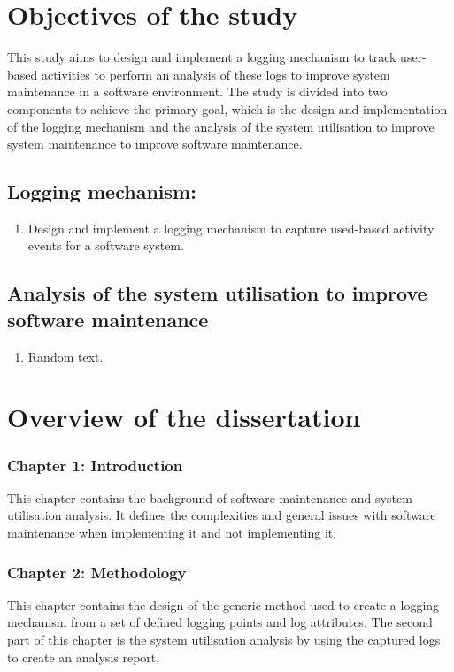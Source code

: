 \section{Objectives of the study}\label{sec:ch1_objectives}
This study aims to design and implement a logging mechanism to track user-based activities to perform an analysis of these logs to improve system maintenance in a software environment. The study is divided into two components to achieve the primary goal, which is the design and implementation of the logging mechanism and the analysis of the system utilisation to improve system maintenance to improve software maintenance.

\subsection{Logging mechanism:}
\begin{enumerate}
	\item Design and implement a logging mechanism to capture used-based activity events for a software system.
\end{enumerate}

\subsection{Analysis of the system utilisation to improve software maintenance}
\begin{enumerate}
	\item Random text.
\end{enumerate}

\section{Overview of the dissertation}
\subsubsection{Chapter 1: Introduction}
This chapter contains the background of software maintenance and system utilisation analysis. It defines the complexities and general issues with software maintenance when implementing it and not implementing it.

\subsubsection{Chapter 2: Methodology}
This chapter contains the design of the generic method used to create a logging mechanism from a set of defined logging points and log attributes. The second part of this chapter is the system utilisation analysis by using the captured logs to create an analysis report.


